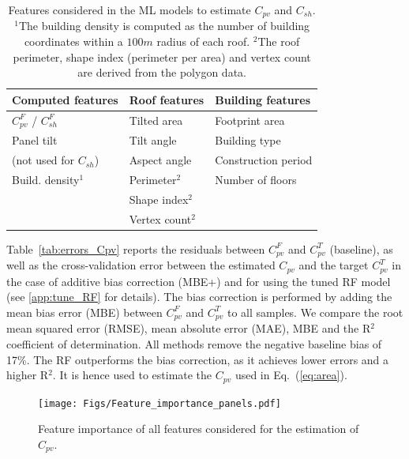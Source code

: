 \begin{table}[b]
\centering
\footnotesize
\caption{Features considered in the ML models to estimate $C_{pv}$ and $C_{sh}$. $^1$The building density is computed as the number of building coordinates within a $100m$ radius of each roof. $^2$The roof perimeter, shape index (perimeter per area) and vertex count are derived from the polygon data.}
\label{tab:features}
\begin{tabular}{lll}
\hline
\textbf{Computed features}               & \textbf{Roof features} & \textbf{Building features} \\
\hline
$C_{pv}^F$ / $C_{sh}^F$ & Tilted area                          & Footprint area                              \\
Panel tilt   & Tilt angle                          & Building type                              \\
(not used for $C_{sh}$)      & Aspect angle                        & Construction period          \\
Build. density$^1$                    & Perimeter$^2$                       & Number of floors                             \\
                                 & Shape index$^2$                       &   \\
 & Vertex count$^2$ & \\ 
\hline                                
\end{tabular}
\end{table}

Table~\ref{tab:errors_Cpv} reports the residuals between $C_{pv}^F$ and $C_{pv}^T$ (baseline), as well as the cross-validation error between the estimated $C_{pv}$ and the target $C_{pv}^T$ in the case of additive bias correction (MBE+) and for using the tuned RF model (see \ref{app:tune_RF} for details).
The bias correction is performed by adding the mean bias error (MBE) between $C_{pv}^F$ and $C_{pv}^T$  to all samples. 
We compare the root mean squared error (RMSE), mean absolute error (MAE), MBE and the R$^2$ coefficient of determination. All methods remove the negative baseline bias of 17\%. The RF outperforms the bias correction, as it achieves lower errors and a higher R$^2$. It is hence used to estimate the $C_{pv}$ used in Eq.~(\ref{eq:area}).

\begin{figure}[tb]
\centering
  \texttt{[image: Figs/Feature\_importance\_panels.pdf]}
\caption{Feature importance of all features considered for the estimation of $C_{pv}$.
}
\label{fig:RF_Cpv}
\end{figure}

